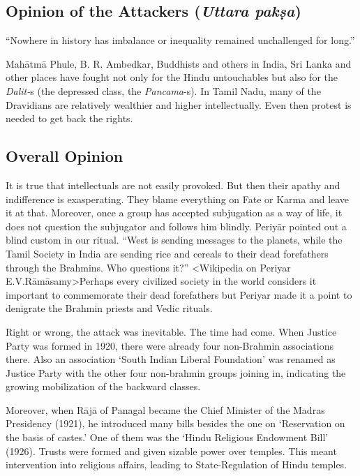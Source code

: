 \subsection*{Opinion of the Attackers (\textit{Uttara pakṣa})}

“Nowhere in history has imbalance or inequality remained unchallenged for long.”

Mahātmā Phule, B. R. Ambedkar, Buddhists and others in India, Sri Lanka and other places have fought not only for the Hindu untouchables but also for the \textit{Dalit-}s (the depressed class, the \textit{Pancama}-s). In Tamil Nadu, many of the Dravidians are relatively wealthier and higher intellectually. Even then protest is needed to get back the rights.


\subsection*{Overall Opinion}

It is true that intellectuals are not easily provoked. But then their apathy and indifference is exasperating. They blame everything on Fate or Karma and leave it at that. Moreover, once a group has accepted subjugation as a way of life, it does not question the subjugator and follows him blindly. Periyār pointed out a blind custom in our ritual. “West is sending messages to the planets, while the Tamil Society in India are sending rice and cereals to their dead forefathers through the Brahmins. Who questions it?” \textless Wikipedia on Periyar E.V.Rāmāsamy\textgreater  Perhaps every civilized society in the world considers it important to commemorate their dead forefathers but Periyar made it a point to denigrate the Brahmin priests and Vedic rituals.

Right or wrong, the attack was inevitable. The time had come. When Justice Party was formed in 1920, there were already four non-Brahmin associations there. Also an association ‘South Indian Liberal Foundation’ was renamed as Justice Party with the other four non-brahmin groups joining in, indicating the growing mobilization of the backward classes.

Moreover, when Rājā of Panagal became the Chief Minister of the Madras Presidency (1921), he introduced many bills besides the one on ‘Reservation on the basis of castes.’ One of them was the ‘Hindu Religious Endowment Bill’ (1926). Trusts were formed and given sizable power over temples. This meant intervention into religious affairs, leading to State-Regulation of Hindu temples.

